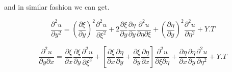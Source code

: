 \documentclass[]{article}
\begin{document}
and in similar fashion we can get.

\begin{equation}
\frac{\partial^2 u}{\partial y^2} = {(\frac{\partial\xi}{\partial y})}^2\frac{\partial^2 u}{\partial\xi^2}+2\frac{\partial\xi}{\partial y}\frac{\partial\eta}{\partial y}\frac{\partial^2 u}{\partial\eta\partial\xi}+{(\frac{\partial\eta}{\partial y})}^2\frac{\partial^2 u}{\partial\eta^2}+Y.T
\end{equation}

\begin{equation}
\frac{\partial^2 u}{\partial y\partial x} = \frac{\partial\xi}{\partial x}\frac{\partial\xi}{\partial y}\frac{\partial^2 u}{\partial\xi^2}+\left[\frac{\partial\xi}{\partial x}\frac{\partial\eta}{\partial y}+\frac{\partial\xi}{\partial y}\frac{\partial\eta}{\partial x}\right]\frac{\partial^2 u}{\partial\xi\partial\eta}+\frac{\partial\eta}{\partial x}\frac{\partial\eta}{\partial y}\frac{\partial^2 u}{\partial\eta^2} + Y.T
\end{equation}
\end{document}
